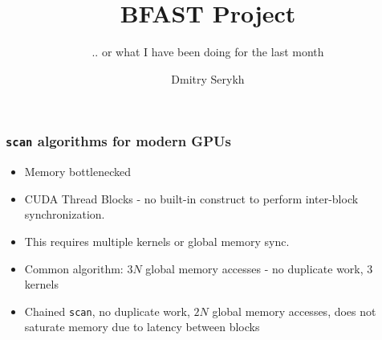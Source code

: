 \documentclass{beamer}
\title{BFAST Project}
\subtitle{.. or what I have been doing for the last month}
\institute{DIKU - University of Copenhagen}
\author{Dmitry Serykh}
\begin{document}
\begin{frame}
\maketitle 
\end{frame}


\begin{frame}
\frametitle{\texttt{scan} algorithms for modern GPUs}
\begin{itemize}
\item Memory bottlenecked
\item CUDA Thread Blocks - no built-in construct to perform inter-block synchronization.
\item This requires multiple kernels or global memory sync.
\item Common algorithm: $3N$ global memory accesses - no duplicate work, $3$ kernels
\item Chained \texttt{scan}, no duplicate work, $2N$ global memory accesses,
  does not saturate memory due to latency between blocks
\end{itemize}
\end{frame}



\end{document}
